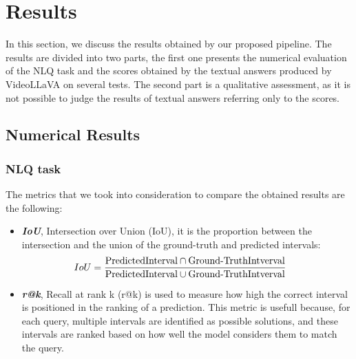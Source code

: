 \documentclass[10pt,twocolumn,letterpaper]{article}
\begin{document}
\section{Results}
In this section, we discuss the results obtained by our proposed pipeline. The results are divided into two parts, the first one presents the numerical evaluation of the NLQ task and the scores obtained by the textual answers produced by VideoLLaVA on several tests. The second part is a qualitative assessment, as it is not possible to judge the results of textual answers referring only to the scores.

\subsection{Numerical Results}
\subsubsection{NLQ task}
The metrics that we took into consideration to compare the obtained results are the following:
\begin{itemize}
    \item \textit{\textbf{IoU}}, Intersection over Union (IoU), it is the proportion between the intersection and the union of the ground-truth and predicted intervals:\\
    \begin{equation}
    \hspace{-0.5cm}
        IoU = \frac{\text{PredictedInterval} \cap \text{Ground-TruthIntverval}}{\text{PredictedInterval} \cup \text{Ground-TruthIntverval}}
    \end{equation}
    \item \textit{\textbf{r@k}}, Recall at rank k (r@k) is used to measure how high the correct interval is positioned in the ranking of a prediction. %
    This metric is usefull because, for each query, multiple intervals are identified as possible solutions, and these intervals are ranked based on how well the model considers them to match the query.
\end{itemize}
\vspace{-0.3cm}
\end{document}
